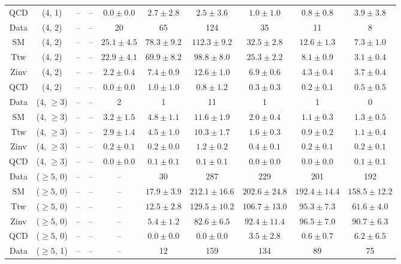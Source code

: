 \begin{table}[h!]
{\begin{tabular}{cccccccccc}
	QCD & (4, 1) & -- & -- & $0.0\pm 0.0$ & $2.7\pm 2.8$ & $2.5\pm 3.6$ & $1.0\pm 1.0$ & $0.8\pm 0.8$ & $3.9\pm 3.8$ \\[0.5ex] 
	Data & (4, 2) & -- & -- & 20 & 65 & 124 & 35 & 11 & 8 \\[0.5ex] 
	SM & (4, 2) & -- & -- & $25.1\pm 4.5$ & $78.3\pm 9.2$ & $112.3\pm 9.2$ & $32.5\pm 2.8$ & $12.6\pm 1.3$ & $7.3\pm 1.0$ \\[0.5ex] 
	Ttw & (4, 2) & -- & -- & $22.9\pm 4.1$ & $69.9\pm 8.2$ & $98.8\pm 8.0$ & $25.3\pm 2.2$ & $8.1\pm 0.9$ & $3.1\pm 0.4$ \\[0.5ex] 
	Zinv & (4, 2) & -- & -- & $2.2\pm 0.4$ & $7.4\pm 0.9$ & $12.6\pm 1.0$ & $6.9\pm 0.6$ & $4.3\pm 0.4$ & $3.7\pm 0.4$ \\[0.5ex] 
	QCD & (4, 2) & -- & -- & $0.0\pm 0.0$ & $1.0\pm 1.0$ & $0.8\pm 1.2$ & $0.3\pm 0.3$ & $0.2\pm 0.1$ & $0.5\pm 0.5$ \\[0.5ex] 
	Data & (4, $\ge3$) & -- & -- & 2 & 1 & 11 & 1 & 1 & 0 \\[0.5ex] 
	SM & (4, $\ge3$) & -- & -- & $3.2\pm 1.5$ & $4.8\pm 1.1$ & $11.6\pm 1.9$ & $2.0\pm 0.4$ & $1.1\pm 0.3$ & $1.3\pm 0.5$ \\[0.5ex] 
	Ttw & (4, $\ge3$) & -- & -- & $2.9\pm 1.4$ & $4.5\pm 1.0$ & $10.3\pm 1.7$ & $1.6\pm 0.3$ & $0.9\pm 0.2$ & $1.1\pm 0.4$ \\[0.5ex] 
	Zinv & (4, $\ge3$) & -- & -- & $0.2\pm 0.1$ & $0.2\pm 0.0$ & $1.2\pm 0.2$ & $0.4\pm 0.1$ & $0.2\pm 0.1$ & $0.2\pm 0.1$ \\[0.5ex] 
	QCD & (4, $\ge3$) & -- & -- & $0.0\pm 0.0$ & $0.1\pm 0.1$ & $0.1\pm 0.1$ & $0.0\pm 0.0$ & $0.0\pm 0.0$ & $0.1\pm 0.1$ \\[0.5ex] 
	Data & ($\ge5$, 0) & -- & -- & -- & 30 & 287 & 229 & 201 & 192 \\[0.5ex] 
	SM & ($\ge5$, 0) & -- & -- & -- & $17.9\pm 3.9$ & $212.1\pm 16.6$ & $202.6\pm 24.8$ & $192.4\pm 14.4$ & $158.5\pm 12.2$ \\[0.5ex] 
	Ttw & ($\ge5$, 0) & -- & -- & -- & $12.5\pm 2.8$ & $129.5\pm 10.2$ & $106.7\pm 13.0$ & $95.3\pm 7.3$ & $61.6\pm 4.0$ \\[0.5ex] 
	Zinv & ($\ge5$, 0) & -- & -- & -- & $5.4\pm 1.2$ & $82.6\pm 6.5$ & $92.4\pm 11.4$ & $96.5\pm 7.0$ & $90.7\pm 6.3$ \\[0.5ex] 
	QCD & ($\ge5$, 0) & -- & -- & -- & $0.0\pm 0.0$ & $0.0\pm 0.0$ & $3.5\pm 2.8$ & $0.6\pm 0.7$ & $6.2\pm 6.5$ \\[0.5ex] 
	Data & ($\ge5$, 1) & -- & -- & -- & 12 & 159 & 134 & 89 & 75 \\[0.5ex] 

\end{tabular}}
\end{table}
